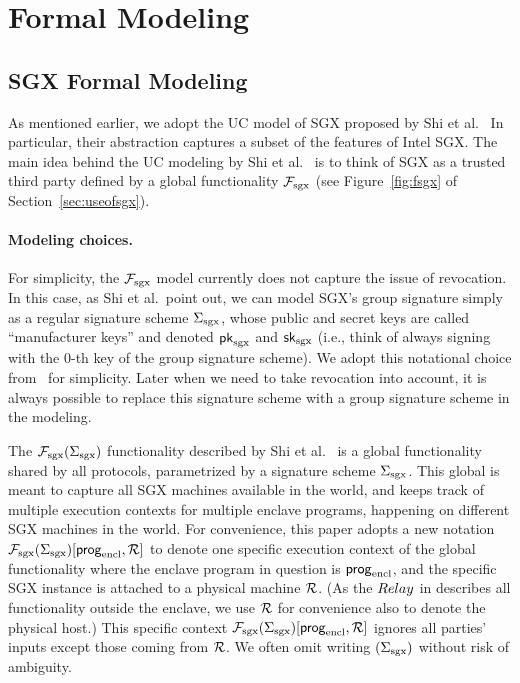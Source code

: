 
\newcommand{\ucstring}[1]{{\color{black} #1}}

\section{Formal Modeling} 
\subsection{SGX Formal Modeling}
\label{sec:sgxmodel}


As mentioned earlier, we adopt the 
UC model of SGX proposed by Shi et al.~\cite{sgxsok}
In particular, their 
abstraction captures a subset of the features 
of Intel SGX. 
The main idea behind the UC modeling by Shi et al.~\cite{sgxsok}
is to think of SGX 
as a trusted third party defined by 
a global functionality $\mathcal{F}_{\textrm{sgx}}$ (see Figure~\ref{fig:fsgx} of 
Section~\ref{sec:useofsgx}).

\paragraph{Modeling choices.}
For simplicity, the $\mathcal{F}_{\textrm{sgx}}$ model currently does not 
capture the issue of revocation.
In this case, as Shi et al.~point out, 
we can model SGX's group signature
simply as a regular signature scheme ${\Sigma_{\textrm{sgx}}}$, whose
public and secret keys 
are called ``manufacturer keys'' and denoted ${\sf pk}_{\mathrm{sgx}}$ and ${\sf sk}_{\mathrm{sgx}}$ 
(i.e., think of always signing 
with the 0-th key of the group signature scheme).
We adopt this notational choice from~\cite{sgxsok} %
for simplicity. Later when 
we need to take revocation into account,
it is always possible to replace this signature 
scheme with a group signature scheme in the modeling.

The $\mathcal{F}_{\textrm{sgx}}({\Sigma_{\textrm{sgx}}})$ functionality described by Shi et al.~\cite{sgxsok} %
is a global functionality shared by all protocols, parametrized
by a signature scheme ${\Sigma_{\textrm{sgx}}}$.
This global \fsgx 
is meant to capture all SGX machines available in the world,
and keeps track of 
multiple execution contexts
for multiple enclave programs, happening on different SGX machines in the world.
For convenience, 
this paper adopts a new notation \linebreak
$\mathcal{F}_{\textrm{sgx}}({\Sigma_{\textrm{sgx}}})[{\sf prog}_{\textrm{encl}}, \mathcal{R}]$
to denote 
one specific execution context of the global \fsgx
functionality where the enclave program in question is ${\sf prog}_{\textrm{encl}}$,
and the specific SGX instance is attached to a physical machine $\mathcal{R}$.
(As the ${Relay}$ in \tc describes all functionality outside the enclave, we use $\mathcal{R}$ for convenience also to denote the physical host.)
This specific context 
$\mathcal{F}_{\textrm{sgx}}({\Sigma_{\textrm{sgx}}})[{\sf prog}_{\textrm{encl}}, \mathcal{R}]$
ignores all parties' inputs except those coming from $\mathcal{R}$.
We often omit writing $({\Sigma_{\textrm{sgx}}})$ without risk of ambiguity.


